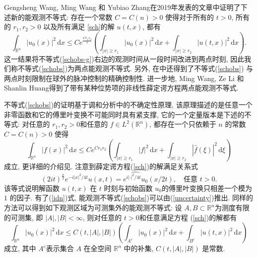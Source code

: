 \documentclass[master]{cugthesis}
\newcommand\R{\ensuremath{\mathbb{R}}}
\renewcommand\d{\ensuremath{\,\mathrm{d}}}
\begin{document}
     Gengsheng Wang, Ming Wang 和 Yubiao Zhang在2019年发表的文章\cite{Wang2019ObservabilityAU}中证明了下述新的能观测不等式: 存在一个常数 $C=C(n)>0$ 使得对于所有的 $t>0$, 所有的 $r_1,r_2>0$ 以及所有满足 \ref{sch}的解 $u(t,x)$, 都有
    \begin{equation}
        \int_{\R^n}|u_0(x)|^2\d x\le C e^{\frac{Cr_1r_2}{t}}\left(\int_{|x|\ge r_1}|u_0(x)|^2\d x+\int_{|x|\ge r_2}|u(t,x)|^2\d x\right).\label{schobs}
    \end{equation}这一结果将不等式(\ref{schobs-g})右边的观测时间从一段时间改进到两点时刻,    因此我们称不等式(\ref{schobs})为两点能观测不等式. 另外, 在\cite[5.2节]{Wang2019ObservabilityAU}中还得到了不等式(\ref{schobs}) 与两点时刻限制在球外的脉冲控制的精确控制性. 进一步地, Ming Wang, Ze Li 和 Shanlin Huang\cite{Wang2021Indiana}得到了带有某种位势项的非线性薛定谔方程两点能观测不等式.
    
    不等式(\ref{schobs})的证明基于调和分析中的不确定性原理, 该原理描述的是任意一个非零函数和它的傅里叶变换不可能同时具有紧支撑, 它的一个定量版本是下述的不等式: 对任意的 $r_1,r_2>0$和任意的 $f\in L^2(\R^n)$, 都存在一个只依赖于 $n$ 的常数 $C=C(n)>0$ 使得
    \begin{equation}
        \int_{\R^n}|f(x)|^2\d x\le C e^{Cr_1r_2}\left(\int_{|x|\ge r_1}|f|^2\d x+\int_{|x|\ge r_2}|\widehat{f}(\xi)|^2\d \xi\right)\label{uncertainty}
    \end{equation}
    成立, 更详细的介绍见\cite{Havin2012, Jaming2007NazarovsUP,Nazarov1993}. 注意到薛定谔方程(\ref{sch})的解满足关系式\cite{Linares2014Ponce}
    \begin{equation}
        (2it)^{\frac{n}{2}}e^{-i|x|^2 / 4t} u(x,t) = \widehat{e^{i|\cdot|^2 /4t}u_0}(x /2t), \quad\text{任意 }t>0.\label{idn}
    \end{equation}
    该等式说明解函数 $u(t,x)$ 在 $t$ 时刻与初始函数 $u_0$的傅里叶变换只相差一个模为 $1$ 的因子. 有了(\ref{idn})式, 能观测不等式(\ref{schobs})可以由(\ref{uncertainty})推出. 同样的方法可以得到如下观测区域为可测集外的能观测不等式: 设 $A,B\subset \R^n$为测度有限的可测集, 即 $|A|,|B|<\infty$, 则对任意的 $t>0$和任意满足方程 (\ref{sch})的解都有
    \begin{equation}
        \int_{\R^n}|u_0(x)|^2\d x\le C(t,|A|,|B|)\left(\int_{A^c}|u_0(x)|^2\d x+\int_{B^c}|u(t,x)|^2\d x\right)\label{schobs-2}
    \end{equation}
    成立, 其中 $A^c$表示集合 $A$ 在全空间 $\R^n$ 中的补集, $C(t,|A|,|B|)$ 是常数.
    
\end{document}
